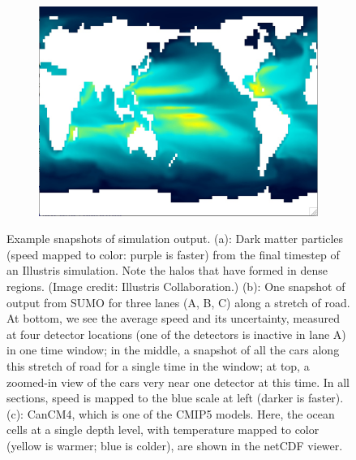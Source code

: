 \begin{figure}[h]
\begin{subfigure}{0.32\textwidth}
        \caption{}
        \label{sumo_example}
    \end{subfigure}
    \begin{subfigure}{0.32\textwidth}
        \includegraphics[width=\textwidth]{images/sampling/CanCM4_screenshot.jpg}
        \caption{}
        \label{cmip_example}
    \end{subfigure}
     \caption{Example snapshots of simulation output. (a): Dark matter particles (speed mapped to color: purple is faster) from the final timestep of an Illustris simulation. Note the halos that have formed in dense regions. (Image credit: Illustris Collaboration.) (b): One snapshot of output from SUMO for three lanes (A, B, C) along a stretch of road. At bottom, we see the average speed and its uncertainty, measured at four detector locations (one of the detectors is inactive in lane A) in one time window; in the middle, a snapshot of all the cars along this stretch of road for a single time in the window; at top, a zoomed-in view of the cars very near one detector at this time. In all sections, speed is mapped to the blue scale at left (darker is faster). (c): CanCM4, which is one of the CMIP5 models. Here, the ocean cells at a single depth level, with temperature mapped to color (yellow is warmer; blue is colder), are shown in the netCDF viewer.}
     \label{data_examples}
\end{figure}



